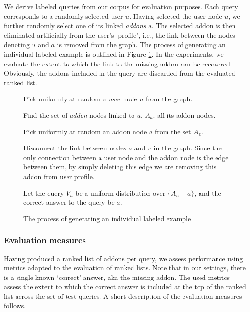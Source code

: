 \documentclass[ijoc,nonblindrev]{informs3} %
\numberwithin{equation}{subsection}
\begin{document}
We derive labeled queries from our corpus for evaluation purposes.  Each query corresponds to a randomly selected user $u$. Having selected the user node $u$, we further randomly select one of its linked {\it addons} $a$. The selected addon is then eliminated artificially from the user's `profile', i.e., the link between the nodes denoting $u$ and $a$ is removed from the graph. The process of generating an individual labeled example is outlined in Figure \ref{fig:example-gen}. In the experiments, we evaluate the extent to which the link to the missing addon can be recovered. Obviously, the addons included in the query are discarded from the evaluated ranked list. 

\begin{figure}
\begin{enumerate}[(a)]
\begin{small}
\item Pick uniformly at random a {\it user} node $u$ from the graph.
\item Find the set of {\it addon} nodes linked to $u$, $A_u$.
  all its addon nodes.
\item Pick uniformly at random an addon node $a$ from the set $A_u$. 
\item Disconnect the link between nodes $a$ and $u$ in the
  graph. Since the only connection between a user node and the addon
  node is the edge between them, by simply deleting this edge we are
  removing this addon from user profile.
\item Let the query $V_u$ be a uniform distribution over $\{A_u-a\}$,
  and the correct answer to the query be $a$. 
\end{small}
\end{enumerate}
\caption{The process of generating an individual labeled example}
\label{fig:example-gen}
\end{figure}

\subsubsection{Evaluation measures}

Having produced a ranked list of addons per query, we assess performance using metrics adapted to the evaluation of ranked lists. Note that in our settings, there is a single known `correct' answer, aka the missing addon. The used metrics assess the extent to which the correct answer is included at the top of the ranked list across the set of test queries. A short description of the evaluation measures follows.
\end{document}
